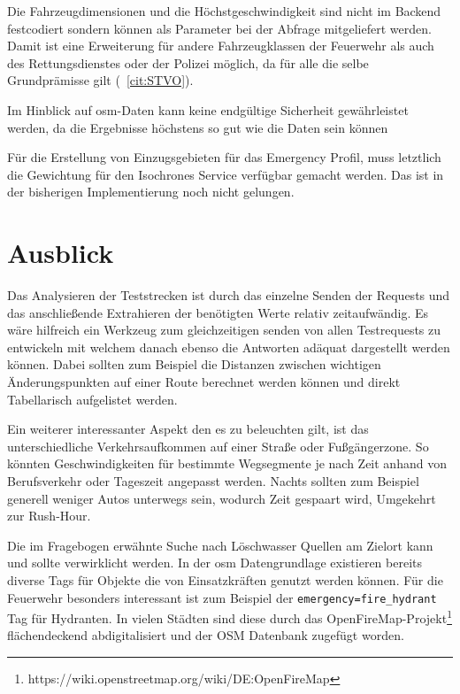 Die Fahrzeugdimensionen und die Höchstgeschwindigkeit sind nicht im Backend festcodiert sondern können als Parameter bei der Abfrage mitgeliefert werden.
Damit ist eine Erweiterung für andere Fahrzeugklassen der Feuerwehr als auch des Rettungsdienstes oder der Polizei möglich, da für alle die selbe Grundprämisse gilt (~\ref{cit:STVO}).

Im Hinblick auf \gls{osm}-Daten kann keine endgültige Sicherheit gewährleistet werden, da die Ergebnisse höchstens so gut wie die Daten sein können

Für die Erstellung von Einzugsgebieten für das Emergency Profil, muss letztlich die Gewichtung für den Isochrones Service verfügbar gemacht werden.
Das ist in der bisherigen Implementierung noch nicht gelungen.

\newpage
\section{Ausblick}


Das Analysieren der Teststrecken ist durch das einzelne Senden der Requests und das anschließende Extrahieren der benötigten Werte relativ zeitaufwändig.
Es wäre hilfreich ein Werkzeug zum gleichzeitigen senden von allen Testrequests zu entwickeln mit welchem danach ebenso die Antworten adäquat dargestellt werden können.
Dabei sollten zum Beispiel die Distanzen zwischen wichtigen Änderungspunkten auf einer Route berechnet werden können und direkt Tabellarisch aufgelistet werden.

Ein weiterer interessanter Aspekt den es zu beleuchten gilt, ist das unterschiedliche Verkehrsaufkommen auf einer Straße oder Fußgängerzone.
So könnten Geschwindigkeiten für bestimmte Wegsegmente je nach Zeit anhand von Berufsverkehr oder Tageszeit angepasst werden.
Nachts sollten zum Beispiel generell weniger Autos unterwegs sein, wodurch Zeit gespaart wird, Umgekehrt zur Rush-Hour.

Die im Fragebogen erwähnte Suche nach Löschwasser Quellen am Zielort kann und sollte verwirklicht werden.
In der \gls{osm} Datengrundlage existieren bereits diverse Tags für Objekte die von Einsatzkräften genutzt werden können.
Für die Feuerwehr besonders interessant ist zum Beispiel der \texttt{emergency=fire\_hydrant} Tag für Hydranten.
In vielen Städten sind diese durch das OpenFireMap-Projekt\footnote{https://wiki.openstreetmap.org/wiki/DE:OpenFireMap} flächendeckend abdigitalisiert und der OSM Datenbank zugefügt worden.